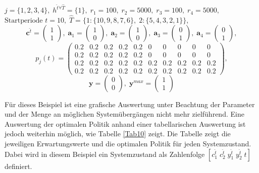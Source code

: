 {\begin{center}
$j = \{1, 2, 3, 4\}, \; h^{\hat{t}\forall \hat T} = \{1\}, \; r_{1} = 100, \; r_{2} = 5000, \; r_{3} = 100, \; r_{4} = 5000,$ \\
$\text{Startperiode } t=10, \; \hat{T}= \{1: \{10,9,8,7,6\},\; 2: \{5,4,3,2,1\}\}  $,
\[\textbf{c}^{\hat{t}}=\begin{pmatrix} 1\\ 1  \end{pmatrix}, \;
    \textbf{a}_1=\begin{pmatrix} 1\\ 0  \end{pmatrix}, \;
\textbf{a}_2=\begin{pmatrix} 1\\ 0  \end{pmatrix}, \;
\textbf{a}_3=\begin{pmatrix} 0\\ 1  \end{pmatrix}, \;
\textbf{a}_4=\begin{pmatrix} 0\\ 1  \end{pmatrix}, \]
         \[ p_{j}(t)=
       \begin{pmatrix}
       0.2 & 0.2 & 0.2 & 0.2 & 0.2 & 0 & 0 & 0 & 0 & 0\\
       0.2 & 0.2 & 0.2 & 0.2 & 0.2 & 0 & 0 & 0 & 0 & 0\\
       0.2 & 0.2 & 0.2 & 0.2 & 0.2 & 0.2 & 0.2 & 0.2 & 0.2 & 0.2\\
       0.2 & 0.2 & 0.2 & 0.2 & 0.2 & 0.2 & 0.2 & 0.2 & 0.2 & 0.2
\end{pmatrix}, 
  \]
  \[
    \textbf{y}= \begin{pmatrix} 0\\ 0\end{pmatrix}, \;
    \textbf{y}^{max}=\begin{pmatrix} 1\\ 1  \end{pmatrix}
      \]
\end{center}}

Für dieses Beispiel ist eine grafische Auswertung unter Beachtung der Parameter und der Menge an möglichen Systemübergängen nicht mehr zielführend. Eine Auswertung der optimalen Politik anhand einer tabellarischen Auswertung ist jedoch weiterhin möglich, wie Tabelle \ref{Tab10} zeigt. Die Tabelle zeigt die jeweiligen Erwartungswerte und die optimalen Politik für jeden Systemzustand. Dabei wird in diesem Beispiel ein Systemzustand als Zahlenfolge $[c_1^{\hat t}\;c_2^{\hat t}\;y_1^{\hat t}\;y_2^{\hat t}\;t]$ definiert.

